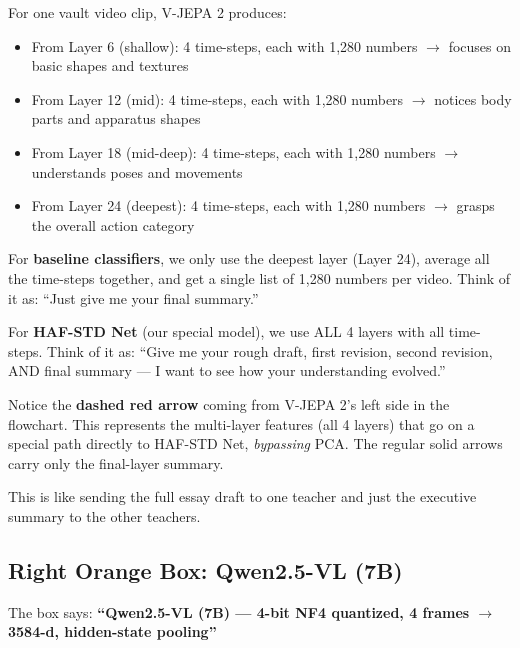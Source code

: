 \documentclass[12pt, a4paper]{article}
\begin{document}
\begin{examplebox}
For one vault video clip, V-JEPA 2 produces:
\begin{itemize}
    \item From Layer 6 (shallow): 4 time-steps, each with 1,280 numbers $\rightarrow$ focuses on basic shapes and textures
    \item From Layer 12 (mid): 4 time-steps, each with 1,280 numbers $\rightarrow$ notices body parts and apparatus shapes
    \item From Layer 18 (mid-deep): 4 time-steps, each with 1,280 numbers $\rightarrow$ understands poses and movements
    \item From Layer 24 (deepest): 4 time-steps, each with 1,280 numbers $\rightarrow$ grasps the overall action category
\end{itemize}
For \textbf{baseline classifiers}, we only use the deepest layer (Layer 24), average all the time-steps together, and get a single list of 1,280 numbers per video. Think of it as: ``Just give me your final summary.''

For \textbf{HAF-STD Net} (our special model), we use ALL 4 layers with all time-steps. Think of it as: ``Give me your rough draft, first revision, second revision, AND final summary — I want to see how your understanding evolved.''
\end{examplebox}

\begin{analogybox}
Notice the \textbf{dashed red arrow} coming from V-JEPA 2's left side in the flowchart. This represents the multi-layer features (all 4 layers) that go on a special path directly to HAF-STD Net, \textit{bypassing} PCA. The regular solid arrows carry only the final-layer summary.

This is like sending the full essay draft to one teacher and just the executive summary to the other teachers.
\end{analogybox}

\subsection{Right Orange Box: Qwen2.5-VL (7B)}

The box says: \textbf{``Qwen2.5-VL (7B) — 4-bit NF4 quantized, 4 frames $\rightarrow$ 3584-d, hidden-state pooling''}
\end{document}
